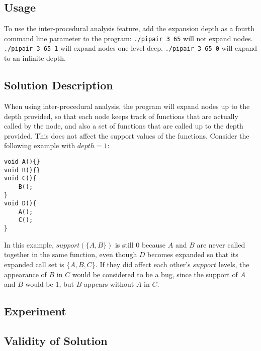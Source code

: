 \documentclass[10pt,a4paper]{article}
\author{Patrick White}
\begin{document}
\subsection{Usage}
To use the inter-procedural analysis feature, add the expansion depth as a fourth command line parameter to the program: \texttt{./pipair 3 65} will not expand nodes. \texttt{./pipair 3 65 1} will expand nodes one level deep. \texttt{./pipair 3 65 0} will expand to an infinite depth.
\subsection{Solution Description}
When using inter-procedural analysis, the program will expand nodes up to the depth provided, so that each node keeps track of functions that are actually called by the node, and also a set of functions that are called up to the depth provided. This does not affect the support values of the functions. Consider the following example with $depth=1$:
\begin{verbatim}
void A(){}
void B(){}
void C(){
	B();
}
void D(){
	A();
	C();
}
\end{verbatim}
In this example, $support(\{A,B\})$ is still $0$ because $A$ and $B$ are never called together in the same function, even though $D$ becomes expanded so that its expanded call set is $\{A,B,C\}$. If they did affect each other's $support$ levels, the appearance of $B$ in $C$ would be considered to be a bug, since the support of $A$ and $B$ would be $1$, but $B$ appears without $A$ in $C$.


\subsection{Experiment}
\subsection{Validity of Solution}
\end{document}
